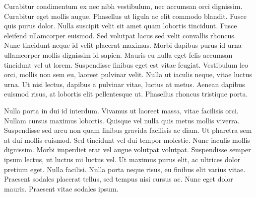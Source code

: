 \documentclass{article}
\begin{document}
Curabitur condimentum ex nec nibh vestibulum, nec accumsan orci dignissim.
Curabitur eget mollis augue. Phasellus ut ligula ac elit commodo blandit. Fusce
quis purus dolor. Nulla suscipit velit sit amet quam lobortis tincidunt. Fusce
eleifend ullamcorper euismod. Sed volutpat lacus sed velit convallis rhoncus.
Nunc tincidunt neque id velit placerat maximus. Morbi dapibus purus id urna
ullamcorper mollis dignissim id sapien. Mauris eu nulla eget felis accumsan
tincidunt vel ut lorem. Suspendisse finibus eget est vitae feugiat. Vestibulum
leo orci, mollis non sem eu, laoreet pulvinar velit. Nulla ut iaculis neque,
vitae luctus urna. Ut nisi lectus, dapibus a pulvinar vitae, luctus at metus.
Aenean dapibus euismod risus, at lobortis elit pellentesque ut. Phasellus
rhoncus tristique porta.


\noindent{}

Nulla porta in dui id interdum. Vivamus ut laoreet massa, vitae facilisis orci.
Nullam cursus maximus lobortis. Quisque vel nulla quis metus mollis viverra.
Suspendisse sed arcu non quam finibus gravida facilisis ac diam. Ut pharetra
sem at dui mollis euismod. Sed tincidunt vel dui tempor molestie. Nunc iaculis
mollis dignissim. Morbi imperdiet erat vel augue volutpat volutpat. Suspendisse
semper ipsum lectus, ut luctus mi luctus vel. Ut maximus purus elit, ac
ultrices dolor pretium eget. Nulla facilisi. Nulla porta neque risus, eu
finibus elit varius vitae. Praesent sodales placerat tellus, sed tempus nisi
cursus ac. Nunc eget dolor mauris. Praesent vitae sodales ipsum.

\printbibliography{}
\end{document}
